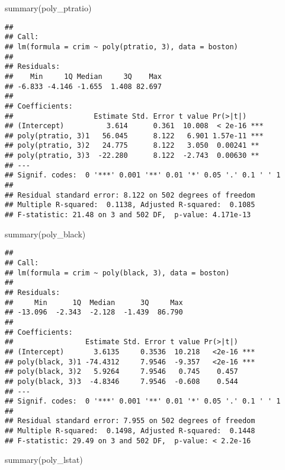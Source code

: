 \documentclass[
]{article}
\newenvironment{Shaded}{\begin{snugshade}}{\end{snugshade}}
\newcommand{\FunctionTok}[1]{\textcolor[rgb]{0.00,0.00,0.00}{#1}}
\newcommand{\NormalTok}[1]{#1}
\begin{document}
\begin{Shaded}
\begin{Highlighting}[]
\FunctionTok{summary}\NormalTok{(poly\_ptratio)}
\end{Highlighting}
\end{Shaded}

\begin{verbatim}
## 
## Call:
## lm(formula = crim ~ poly(ptratio, 3), data = boston)
## 
## Residuals:
##    Min     1Q Median     3Q    Max 
## -6.833 -4.146 -1.655  1.408 82.697 
## 
## Coefficients:
##                   Estimate Std. Error t value Pr(>|t|)    
## (Intercept)          3.614      0.361  10.008  < 2e-16 ***
## poly(ptratio, 3)1   56.045      8.122   6.901 1.57e-11 ***
## poly(ptratio, 3)2   24.775      8.122   3.050  0.00241 ** 
## poly(ptratio, 3)3  -22.280      8.122  -2.743  0.00630 ** 
## ---
## Signif. codes:  0 '***' 0.001 '**' 0.01 '*' 0.05 '.' 0.1 ' ' 1
## 
## Residual standard error: 8.122 on 502 degrees of freedom
## Multiple R-squared:  0.1138, Adjusted R-squared:  0.1085 
## F-statistic: 21.48 on 3 and 502 DF,  p-value: 4.171e-13
\end{verbatim}

\begin{Shaded}
\begin{Highlighting}[]
\FunctionTok{summary}\NormalTok{(poly\_black)}
\end{Highlighting}
\end{Shaded}

\begin{verbatim}
## 
## Call:
## lm(formula = crim ~ poly(black, 3), data = boston)
## 
## Residuals:
##     Min      1Q  Median      3Q     Max 
## -13.096  -2.343  -2.128  -1.439  86.790 
## 
## Coefficients:
##                 Estimate Std. Error t value Pr(>|t|)    
## (Intercept)       3.6135     0.3536  10.218   <2e-16 ***
## poly(black, 3)1 -74.4312     7.9546  -9.357   <2e-16 ***
## poly(black, 3)2   5.9264     7.9546   0.745    0.457    
## poly(black, 3)3  -4.8346     7.9546  -0.608    0.544    
## ---
## Signif. codes:  0 '***' 0.001 '**' 0.01 '*' 0.05 '.' 0.1 ' ' 1
## 
## Residual standard error: 7.955 on 502 degrees of freedom
## Multiple R-squared:  0.1498, Adjusted R-squared:  0.1448 
## F-statistic: 29.49 on 3 and 502 DF,  p-value: < 2.2e-16
\end{verbatim}

\begin{Shaded}
\begin{Highlighting}[]
\FunctionTok{summary}\NormalTok{(poly\_lstat)}
\end{Highlighting}
\end{Shaded}
\end{document}
